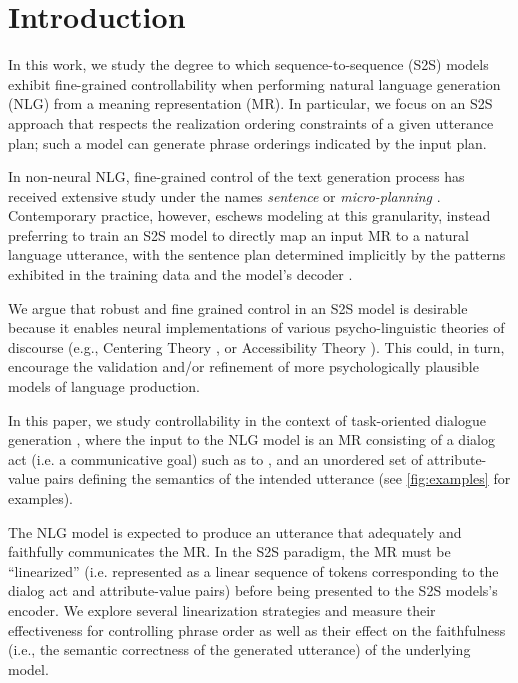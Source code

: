\section{Introduction}

In this work, we study the degree to which sequence-to-sequence (S2S) models
exhibit fine-grained controllability when performing natural language
generation (NLG) from a meaning representation (MR).  In particular, we focus
on an  S2S approach that respects the realization ordering constraints of a
given utterance plan; such a model can generate phrase orderings indicated by
the input plan. 


In non-neural NLG, fine-grained control of the text generation process has
received extensive study under the names \textit{sentence} or
\textit{micro-planning} \cite{reiter2000,walker2001,stone2003}.  Contemporary
practice, however, eschews modeling at this granularity, instead preferring to
train an S2S model to directly map an input MR to a natural language
utterance, with the sentence plan determined implicitly by the patterns
exhibited in the training data and the model's decoder \cite{dusek2020}. 

We argue that robust and fine grained control in an S2S model is desirable
because it enables neural implementations of various psycho-linguistic
theories of discourse (e.g., Centering Theory \cite{grosz1995}, or
Accessibility Theory \cite{ariel2001}).  This could, in turn, encourage the
validation and/or refinement of more psychologically plausible models of
language production.
 


In this paper, we study controllability in the context of task-oriented
dialogue generation \cite{mairesse2010,wen2015}, where the input to the NLG
model is an MR consisting of a dialog act (i.e. a communicative goal) such as
to , and an unordered set of attribute-value pairs
defining the semantics of the intended utterance (see \autoref{fig:examples}
for examples). 


The NLG model is expected to produce an utterance that adequately and
faithfully communicates the MR.  In the S2S paradigm, the MR must be
``linearized'' (i.e.  represented as a linear sequence of tokens corresponding
to the dialog act and attribute-value pairs) before being presented to the S2S
models's encoder.  We explore several linearization strategies and measure
their effectiveness for controlling phrase order as well as their effect on
the faithfulness (i.e., the semantic correctness of the generated utterance)
of the underlying model.

